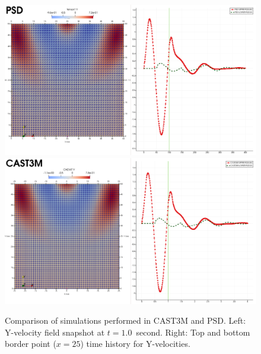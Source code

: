\documentclass{report}
\begin{document}
\begin{figure}
	\centering
	\includegraphics[width=.8\textwidth]{./Images/PSD-t1}\\\vspace{1cm}
	\includegraphics[width=.8\textwidth]{./Images/CAST3M-t1}
	\caption{Comparison of simulations performed  in CAST3M and PSD. Left: Y-velocity field snapshot at $t=1.0$~second. Right: Top and bottom border point ($x=25$) time history for Y-velocities.   }\label{fig:CastemPSD1}
\end{figure}
\end{document}
